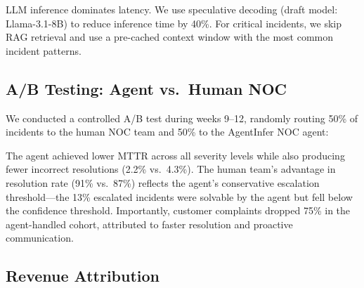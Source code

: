 \documentclass[conference,10pt,letterpaper]{IEEEtran}
\begin{document}
LLM inference dominates latency. We use speculative decoding (draft model: Llama-3.1-8B) to reduce inference time by 40\%. For critical incidents, we skip RAG retrieval and use a pre-cached context window with the most common incident patterns.



\subsection{A/B Testing: Agent vs.\ Human NOC}

We conducted a controlled A/B test during weeks 9--12, randomly routing 50\% of incidents to the human NOC team and 50\% to the AgentInfer NOC agent:

\begin{table}[!t]
\caption{Controlled A/B Test: Agent vs.\ Human NOC (Weeks 9--12)}
\label{tab:ab}
\centering\scriptsize
{}
\end{table}

The agent achieved lower MTTR across all severity levels while also producing fewer incorrect resolutions (2.2\% vs.\ 4.3\%). The human team's advantage in resolution rate (91\% vs.\ 87\%) reflects the agent's conservative escalation threshold---the 13\% escalated incidents were solvable by the agent but fell below the confidence threshold. Importantly, customer complaints dropped 75\% in the agent-handled cohort, attributed to faster resolution and proactive communication.

\subsection{Revenue Attribution}
\end{document}
